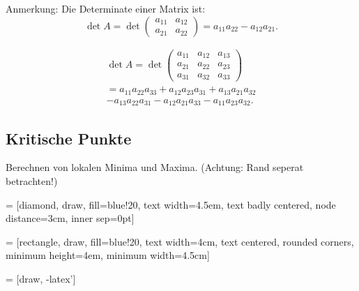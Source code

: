 Anmerkung: Die Determinate einer Matrix ist: 
$$\det A=\det
  \begin{pmatrix}
    a_{11} & a_{12} \\
    a_{21} & a_{22} 
  \end{pmatrix} 
= a_{11} a_{22} - a_{12} a_{21}.$$

\begin{equation}\begin{split}
\det A = \det
  \begin{pmatrix}
    a_{11} & a_{12} & a_{13} \\
    a_{21} & a_{22} & a_{23} \\
    a_{31} & a_{32} & a_{33} 
  \end{pmatrix}
\\= a_{11} a_{22} a_{33} +a_{12} a_{23} a_{31} + a_{13} a_{21} a_{32} 
\\ - a_{13} a_{22} a_{31} - a_{12} a_{21} a_{33} - a_{11} a_{23} a_{32}.
\end{split}\end{equation}

\subsection{Kritische Punkte}
Berechnen von lokalen Minima und Maxima. (Achtung: Rand seperat betrachten!)

 = [diamond, draw, fill=blue!20, 
text width=4.5em, text badly centered, node distance=3cm, inner sep=0pt]

 = [rectangle, draw, fill=blue!20, 
text width=4cm, text centered, rounded corners, minimum height=4em, minimum width=4.5cm]

 = [draw, -latex']

\newcommand\hlight[1]{\tikz[overlay, remember picture,baseline=-\the\dimexpr\fontdimen22\textfont2\relax]\node[rectangle,fill=yellow!50,rounded corners,fill opacity = 0.2,draw,thick,text opacity =1] {$#1$};} 



